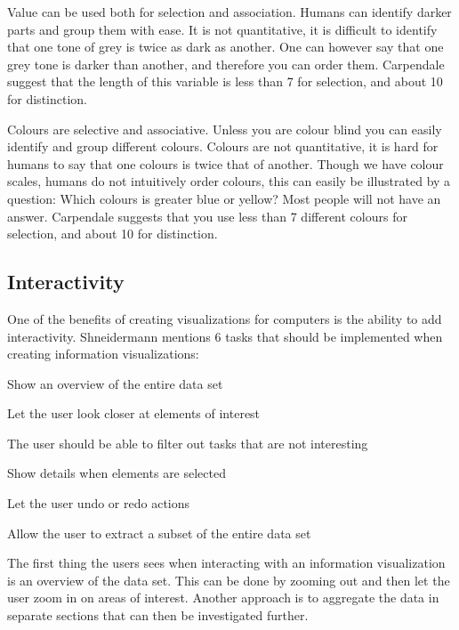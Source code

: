 Value can be used both for selection and association. Humans can identify darker parts and group them with ease. It is not quantitative, it is difficult to identify that one tone of grey is twice as dark as another. One can however say that one grey tone is darker than another, and therefore you can order them. Carpendale suggest that the length of this variable is less than 7 for selection, and about 10 for distinction.

Colours are selective and associative. Unless you are colour blind you can easily identify and group different colours. Colours are not quantitative, it is hard for humans to say that one colours is twice that of another. Though we have colour scales, humans do not intuitively order colours, this can easily be illustrated by a question: Which colours is greater blue or yellow? Most people will not have an answer. Carpendale suggests that you use less than 7 different colours for selection, and about 10 for distinction.

\subsection{Interactivity}
One of the benefits of creating visualizations for computers is the ability to add interactivity. Shneidermann mentions 6 tasks that should be implemented when creating information visualizations:
\vspace{-3mm}
\begin{description}[itemsep=0cm, parsep=0cm]
  \item[Overview] Show an overview of the entire data set
  \item[Zoom] Let the user look closer at elements of interest
  \item[Filter] The user should be able to filter out tasks that are not interesting
  \item[Details-on-demand] Show details when elements are selected
  \item[History] Let the user undo or redo actions
  \item[Extract] Allow the user to extract a subset of the entire data set
\end{description}

The first thing the users sees when interacting with an information visualization is an overview of the data set. This can be done by zooming out and then let the user zoom in on areas of interest. Another approach is to aggregate the data in separate sections that can then be investigated further.


